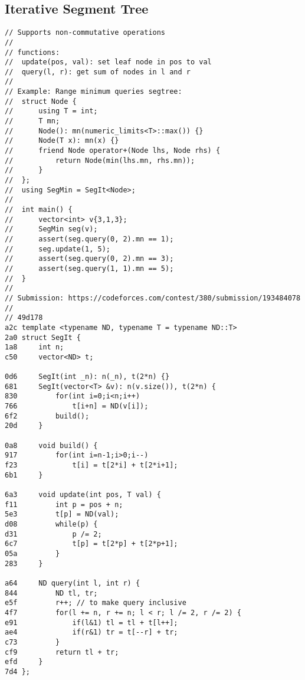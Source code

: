 \documentclass[11pt, a4paper, twoside]{article}
\begin{document}
\subsection{Iterative Segment Tree}
\begin{lstlisting}
// Supports non-commutative operations
//
// functions:
// 	update(pos, val): set leaf node in pos to val
// 	query(l, r): get sum of nodes in l and r
//
// Example: Range minimum queries segtree:
// 	struct Node {
// 		using T = int;
// 		T mn;
// 		Node(): mn(numeric_limits<T>::max()) {}
// 		Node(T x): mn(x) {}
// 		friend Node operator+(Node lhs, Node rhs) {
// 			return Node(min(lhs.mn, rhs.mn));
// 		}
// 	};
// 	using SegMin = SegIt<Node>;
//
//	int main() {
//		vector<int> v{3,1,3};
// 		SegMin seg(v);
// 		assert(seg.query(0, 2).mn == 1);
// 		seg.update(1, 5);
// 		assert(seg.query(0, 2).mn == 3);
// 		assert(seg.query(1, 1).mn == 5);
// 	}
//
// Submission: https://codeforces.com/contest/380/submission/193484078
//
// 49d178
a2c template <typename ND, typename T = typename ND::T>
2a0 struct SegIt {
1a8 	int n;
c50 	vector<ND> t;
    
0d6 	SegIt(int _n): n(_n), t(2*n) {} 
681 	SegIt(vector<T> &v): n(v.size()), t(2*n) {
830 		for(int i=0;i<n;i++)
766 			t[i+n] = ND(v[i]);
6f2 		build();
20d 	}
    
0a8 	void build() {
917 		for(int i=n-1;i>0;i--) 
f23 			t[i] = t[2*i] + t[2*i+1];
6b1 	}
    
6a3 	void update(int pos, T val) {
f11 		int p = pos + n;
5e3 		t[p] = ND(val);
d08 		while(p) {
d31 			p /= 2;
6c7 			t[p] = t[2*p] + t[2*p+1];
05a 		}
283 	}
    
a64 	ND query(int l, int r) {
844 		ND tl, tr;
e5f 		r++; // to make query inclusive
4f7 		for(l += n, r += n; l < r; l /= 2, r /= 2) {
e91 			if(l&1) tl = tl + t[l++];
ae4 			if(r&1) tr = t[--r] + tr;
c73 		}
cf9 		return tl + tr;
efd 	}
7d4 };
\end{lstlisting}
\end{document}
